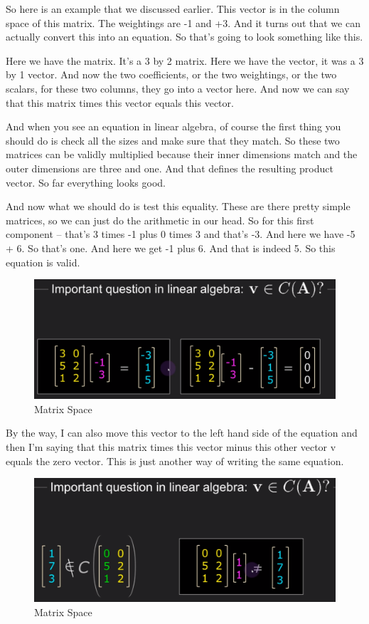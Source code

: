 \documentclass[fleqn,10pt]{olplainarticle}
\theoremstyle{definition}
\theoremstyle{remark}
\begin{document}
So here is an example that we discussed earlier. This vector is in the column space of this matrix. The weightings are -1 and +3. And it turns out that we can actually convert this into an equation. So that's going to look something like this.

Here we have the matrix. It's a 3 by 2 matrix. Here we have the vector, it was a 3 by 1 vector. And now the two coefficients, or the two weightings, or the two scalars, for these two columns, they go into a vector here. And now we can say that this matrix times this vector equals this vector.

And when you see an equation in linear algebra, of course the first thing you should do is check all the sizes and make sure that they match. So these two matrices can be validly multiplied because their inner dimensions match and the outer dimensions are three and one. And that defines the resulting product vector. So far everything looks good.

And now what we should do is test this equality. These are there pretty simple matrices, so we can just do the arithmetic in our head. So for this first component -- that's 3 times -1 plus 0 times 3 and that's -3. And here we have -5 + 6. So that's one. And here we get -1 plus 6. And that is indeed 5. So this equation is valid. 

\begin{figure}[ht]
	\centering
	\includegraphics[width=0.5\linewidth]{images/matrix-space-09.png}
	\caption{Matrix Space}
	\label{fig:matrix_space_09}
\end{figure}

By the way, I can also move this vector to the left hand side of the equation and then I'm saying that this matrix times this vector minus this other vector v equals the zero vector. This is just another way of writing the same equation.

\begin{figure}[ht]
	\centering
	\includegraphics[width=0.5\linewidth]{images/matrix-space-10.png}
	\caption{Matrix Space}
	\label{fig:matrix_space_10}
\end{figure}
\end{document}
